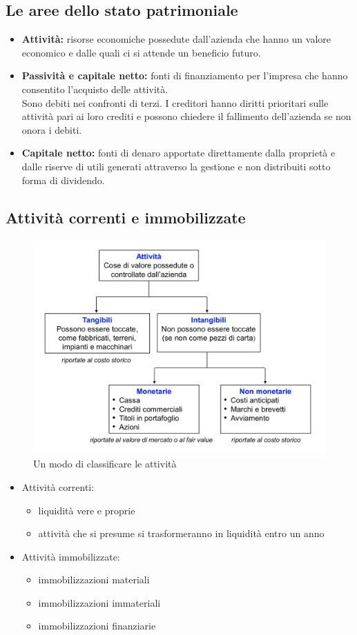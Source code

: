 \documentclass{report}
\newcommand\hr{\par\vspace{-.5\ht\strutbox}\noindent\hrulefill\par}
\begin{document}
	\subsection{Le aree dello stato patrimoniale}
	\begin{itemize}
		\item \textbf{Attività:} risorse economiche possedute dall'azienda che hanno un valore economico e dalle quali ci si attende un beneficio futuro.
		\hr
		\item \textbf{Passività e capitale netto:} fonti di finanziamento per l'impresa che hanno consentito l'acquisto delle attività.
		\medskip \\Sono debiti nei confronti di terzi. I creditori hanno diritti prioritari sulle attività pari ai loro crediti e possono chiedere il fallimento dell'azienda se non onora i debiti.
		\item \textbf{Capitale netto:} fonti di denaro apportate direttamente dalla proprietà e dalle riserve di utili generati attraverso la gestione e non distribuiti sotto forma di dividendo.
	\end{itemize}
	\subsection{Attività correnti e immobilizzate}
	\begin{figure}[h]
		\centering
		\caption{Un modo di classificare le attività}
		\label{fig:classificazione-attivita}
		\includegraphics[width=0.7\linewidth]{classificazione-attivita}
	\end{figure}
	\begin{itemize}
		\item Attività correnti:
		\begin{itemize}
			\item liquidità vere e proprie
			\item attività che si presume si trasformeranno in liquidità entro un anno \\
		\end{itemize}
		\item Attività immobilizzate:
		\begin{itemize}
			\item immobilizzazioni materiali
			\item immobilizzazioni immateriali
			\item immobilizzazioni finanziarie
		\end{itemize}
	\end{itemize}
\end{document}
